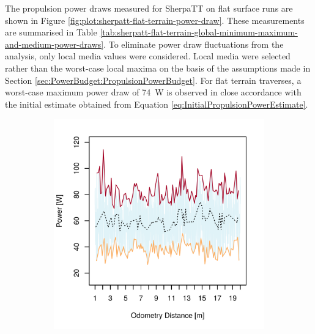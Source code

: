 The propulsion power draws measured for SherpaTT on flat surface runs are shown in Figure \ref{fig:plot:sherpatt-flat-terrain-power-draw}. These measurements are summarised in Table \ref{tab:sherpatt-flat-terrain-global-minimum-maximum-and-medium-power-draws}. To eliminate power draw fluctuations from the analysis, only local media values were considered. Local media were selected rather than the worst-case local maxima on the basis of the assumptions made in Section \ref{sec:PowerBudget:PropulsionPowerBudget}. For flat terrain traverses, a worst-case maximum power draw of \SI{74}{\watt} is observed in close accordance with the initial estimate obtained from Equation \ref{eq:InitialPropulsionPowerEstimate}.
\pagebreak

\begin{figure}[h]
\captionsetup[subfigure]{justification=centering}
\vspace{-2ex}
	\centering
    \setlength{\subfigureWidth}{0.50\textwidth}
    \setlength{\graphicsHeight}{80mm}
    \hypersetup{hidelinks=true}%
    \begin{subfigure}[t]{\subfigureWidth}
        \centering
        \includegraphics[height=\graphicsHeight]{sections/locomotion-power-draws/plots/locomotion-power-draw-on-flat-terrain-1.png}

\end{subfigure}
\end{figure}

